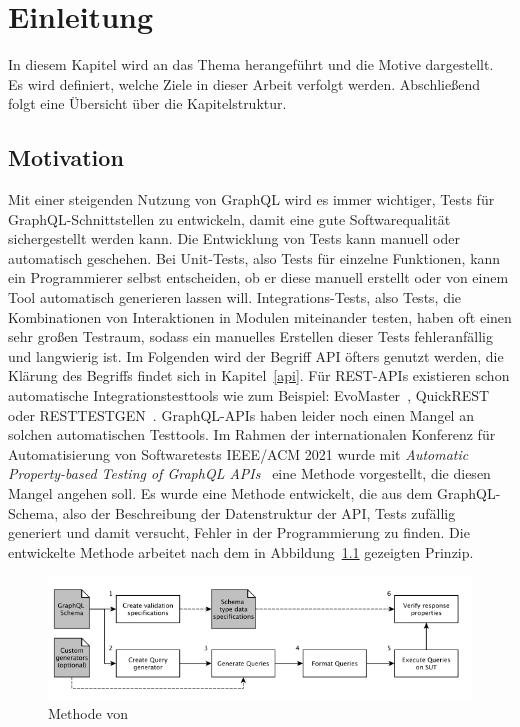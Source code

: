 \chapter{Einleitung}

In diesem Kapitel wird an das Thema herangeführt und die Motive dargestellt.
Es wird definiert, welche Ziele in dieser Arbeit verfolgt werden.
Abschließend folgt eine Übersicht über die Kapitelstruktur.

\section{Motivation}

Mit einer steigenden Nutzung von GraphQL wird es immer wichtiger, Tests für GraphQL-Schnittstellen zu entwickeln, damit eine gute Softwarequalität sichergestellt werden kann.
Die Entwicklung von Tests kann manuell oder automatisch geschehen.
Bei Unit-Tests, also Tests für einzelne Funktionen, kann ein Programmierer selbst entscheiden, ob er diese manuell erstellt
oder von einem Tool automatisch generieren lassen will.
Integrations-Tests, also Tests, die Kombinationen von Interaktionen in Modulen miteinander testen, haben oft
einen sehr großen Testraum, sodass ein manuelles Erstellen dieser Tests fehleranfällig und langwierig ist.
Im Folgenden wird der Begriff API öfters genutzt werden, die Klärung des Begriffs findet sich in Kapitel~\ref{api}.
Für REST-APIs existieren schon automatische Integrationstesttools wie zum Beispiel: EvoMaster~\cite{evo-master}, QuickREST~\cite{karlsson2019quickrest} oder RESTTESTGEN~\cite{rest-test-gen}.
GraphQL-APIs haben leider noch einen Mangel an solchen automatischen Testtools.
Im Rahmen der internationalen  Konferenz für Automatisierung  von  Softwaretests IEEE/ACM 2021 wurde mit
\textit{Automatic Property-based Testing of GraphQL APIs}~\cite{property-based-testing} eine Methode vorgestellt, die diesen Mangel angehen soll.
Es wurde eine Methode entwickelt, die aus dem GraphQL-Schema, also der Beschreibung der Datenstruktur der API, Tests zufällig generiert und damit versucht, Fehler in der Programmierung zu finden.
Die entwickelte Methode arbeitet nach dem in Abbildung~\ref{property-based-method} gezeigten Prinzip.

\begin{figure}[h!]
    \centering
    \includegraphics[width=\textwidth,height=\textheight,keepaspectratio]{content/einleitung/toolchain}
    \caption{Methode von~\cite{property-based-testing}}
    \label{property-based-method}
\end{figure}
\newpage


